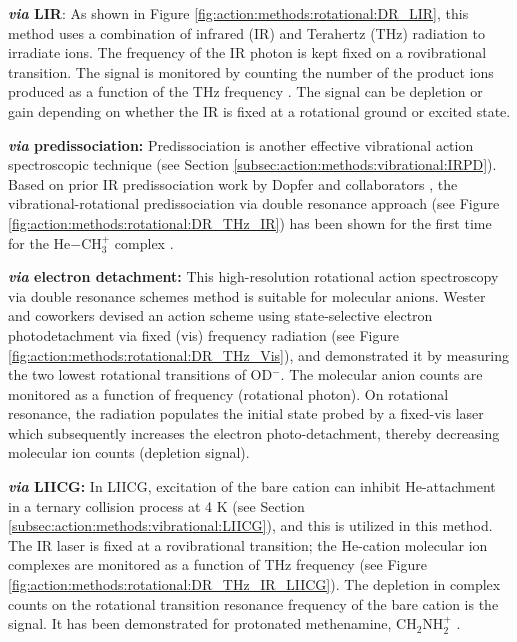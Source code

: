 \textbf{\emph{via} LIR}: As shown in Figure \ref{fig:action:methods:rotational:DR_LIR}, this method uses a combination of infrared (IR) and Terahertz (THz) radiation to irradiate ions. The frequency of the IR photon is kept fixed on a rovibrational transition. The signal is monitored by counting the number of the product ions produced as a function of the THz frequency \cite{Gartner2013,jusko_two-photon_2014}. The signal can be depletion or gain depending on whether the IR is fixed at a rotational ground or excited state.

\textbf{\emph{via} predissociation:} Predissociation is another effective vibrational action spectroscopic technique (see Section \ref{subsec:action:methods:vibrational:IRPD}). Based on prior IR predissociation work by Dopfer and collaborators \cite{olkhov_intermolecular_1999}, the vibrational-rotational predissociation via double resonance approach (see Figure \ref{fig:action:methods:rotational:DR_THz_IR}) has been shown for the first time for the He$-$CH$_3^+$ complex \cite{Topfer2018}.

\textbf{\emph{via} electron detachment:}
This high-resolution rotational action spectroscopy via double resonance schemes method is suitable for molecular anions. Wester and coworkers \cite{lee_terahertz-visible_2016} devised an action scheme using state-selective electron photodetachment via fixed  (vis) frequency radiation (see Figure \ref{fig:action:methods:rotational:DR_THz_Vis}), and demonstrated it by measuring the two lowest rotational transitions of OD$^-$. The molecular anion counts are monitored as a function of frequency (rotational photon). On rotational resonance, the radiation populates the initial state probed by a fixed-vis laser which subsequently increases the electron photo-detachment, thereby decreasing molecular ion counts (depletion signal).

\textbf{\emph{via} LIICG: } In LIICG, excitation of the bare cation can inhibit He-attachment in a ternary collision process at 4 K (see Section \ref{subsec:action:methods:vibrational:LIICG}), and this is utilized in this method. The IR laser is fixed at a rovibrational transition; the He-cation molecular ion complexes are monitored as a function of THz frequency (see Figure \ref{fig:action:methods:rotational:DR_THz_IR_LIICG}). The depletion in complex counts on the rotational transition resonance frequency of the bare cation is the signal. It has been demonstrated for protonated methenamine, CH$_2$NH$_2^+$ \cite{Markus2019}.

